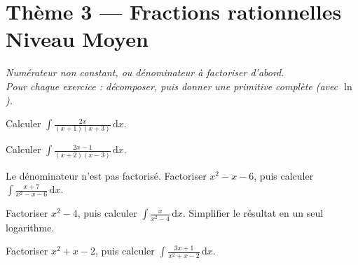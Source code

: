 \documentclass[11pt,a4paper]{article}
\newcommand{\dd}{\mathrm{d}}
\begin{document}
\section*{Thème 3 — Fractions rationnelles \quad\textbullet\quad Niveau Moyen}

\begin{center}\itshape
Numérateur non constant, ou dénominateur à factoriser d'abord.\\
Pour chaque exercice : décomposer, puis donner une primitive complète (avec $\ln$).
\end{center}

\begin{exo}[1]
Calculer $\displaystyle\int \frac{2x}{(x+1)(x+3)}\,\dd x$.
\end{exo}

\begin{exo}[2]
Calculer $\displaystyle\int \frac{2x-1}{(x+2)(x-3)}\,\dd x$.
\end{exo}

\begin{exo}[3]
Le dénominateur n'est pas factorisé. Factoriser $x^2-x-6$, puis calculer
$\displaystyle\int \frac{x+7}{x^2-x-6}\,\dd x$.
\end{exo}

\begin{exo}[4]
Factoriser $x^2-4$, puis calculer
$\displaystyle\int \frac{x}{x^2-4}\,\dd x$.
Simplifier le résultat en un seul logarithme.
\end{exo}

\begin{exo}[5]
Factoriser $x^2+x-2$, puis calculer
$\displaystyle\int \frac{3x+1}{x^2+x-2}\,\dd x$.
\end{exo}
\end{document}
